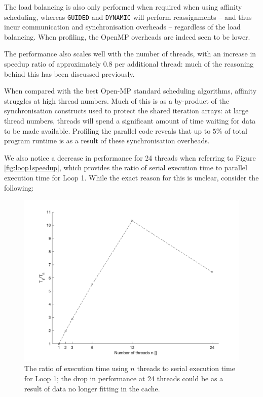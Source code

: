 \documentclass{article} %
\newcommand{\tp}{\texttt}
\begin{document}
The load balancing is also only performed when required when using affinity scheduling, whereas \tp{GUIDED} and \tp{DYNAMIC} will perform reassignments -- and thus incur communication and synchronisation overheads -- regardless of the load balancing.
When profiling, the OpenMP overheads are indeed seen to be lower.

The performance also scales well with the number of threads, with an increase in speedup ratio of approximately $0.8$ per additional thread: much of the reasoning behind this has been discussed previously.

When compared with the best Open-MP standard scheduling algorithms, affinity struggles at high thread numbers.
Much of this is as a by-product of the synchronisation constructs used to protect the shared iteration arrays: at large thread numbers, threads will spend a significant amount of time waiting for data to be made available.
Profiling the parallel code reveals that up to $5$\% of total program runtime is as a result of these synchronisation overheads.

We also notice a decrease in performance for 24 threads when referring to Figure \ref{fig:loop1speedup}, which provides the ratio of serial execution time to parallel execution time for Loop 1.
While the exact reason for this is unclear, consider the following:

\begin{figure}
    \centering
    \includegraphics[height=.35\textheight]{part2_plots/speedup_affinity_loop1.png}
    \caption{The ratio of execution time using $n$ threads to serial execution time for Loop 1; the drop in performance at 24 threads could be as a result of data no longer fitting in the cache.}
\end{figure}
\end{document}
